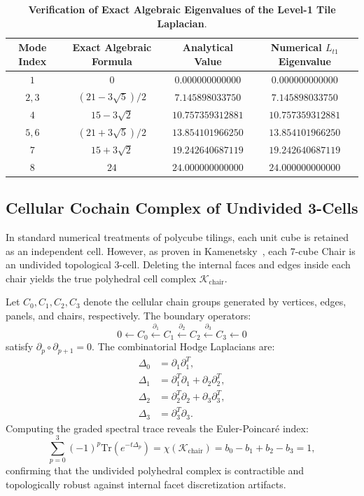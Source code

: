 \documentclass[11pt,a4paper]{article}
\theoremstyle{definition}
\newcommand{\Tr}{\mathrm{Tr}}
\begin{document}
\begin{table}[h!]
\centering
\small
\caption{\textbf{Verification of Exact Algebraic Eigenvalues of the Level-1 Tile Laplacian}.}
\label{tab:eigenvalues}
\begin{tabular}{cccc}
\toprule
\textbf{Mode Index} & \textbf{Exact Algebraic Formula} & \textbf{Analytical Value} & \textbf{Numerical $L_{t1}$ Eigenvalue} \\
\midrule
$1$ & $0$ & $0.000000000000$ & $0.000000000000$ \\
$2, 3$ & $(21 - 3\sqrt{5})/2$ & $7.145898033750$ & $7.145898033750$ \\
$4$ & $15 - 3\sqrt{2}$ & $10.757359312881$ & $10.757359312881$ \\
$5, 6$ & $(21 + 3\sqrt{5})/2$ & $13.854101966250$ & $13.854101966250$ \\
$7$ & $15 + 3\sqrt{2}$ & $19.242640687119$ & $19.242640687119$ \\
$8$ & $24$ & $24.000000000000$ & $24.000000000000$ \\
\bottomrule
\end{tabular}
\end{table}

\subsection{Cellular Cochain Complex of Undivided 3-Cells}

In standard numerical treatments of polycube tilings, each unit cube is retained as an independent cell. However, as proven in Kamenetsky~\cite{Kamenetsky2026}, each 7-cube Chair is an undivided topological 3-cell. Deleting the internal faces and edges inside each chair yields the true polyhedral cell complex $\mathcal{K}_{\mathrm{chair}}$.

Let $C_0, C_1, C_2, C_3$ denote the cellular chain groups generated by vertices, edges, panels, and chairs, respectively. The boundary operators:
\begin{equation}
0 \longleftarrow C_0 \xleftarrow{\partial_1} C_1 \xleftarrow{\partial_2} C_2 \xleftarrow{\partial_3} C_3 \longleftarrow 0
\end{equation}
satisfy $\partial_p \circ \partial_{p+1} = 0$. The combinatorial Hodge Laplacians are:
\begin{align}
\Delta_0 &= \partial_1 \partial_1^T, \\
\Delta_1 &= \partial_1^T \partial_1 + \partial_2 \partial_2^T, \\
\Delta_2 &= \partial_2^T \partial_2 + \partial_3 \partial_3^T, \\
\Delta_3 &= \partial_3^T \partial_3.
\end{align}
Computing the graded spectral trace reveals the Euler-Poincar\'e index:
\begin{equation}
\sum_{p=0}^3 (-1)^p \Tr\left( e^{-t \Delta_p} \right) = \chi(\mathcal{K}_{\mathrm{chair}}) = b_0 - b_1 + b_2 - b_3 = 1,
\end{equation}
confirming that the undivided polyhedral complex is contractible and topologically robust against internal facet discretization artifacts.
\end{document}
